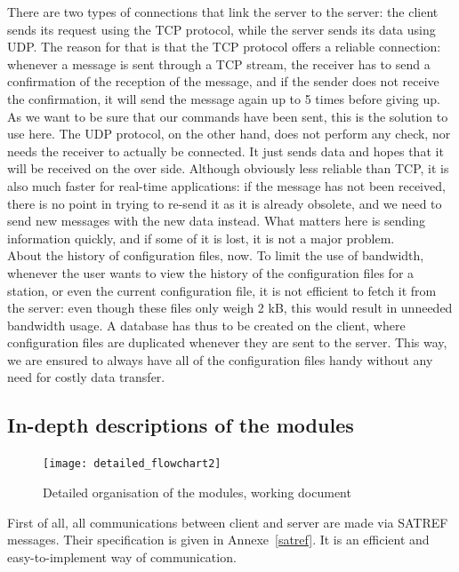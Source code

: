 \documentclass{themeensg}
\begin{document}
There are two types of connections that link the server to the server: the client sends its request using the TCP protocol, while the server sends its data using UDP. The reason for that is that the TCP protocol offers a reliable connection: whenever a message is sent through a TCP stream, the receiver has to send a confirmation of the reception of the message, and if the sender does not receive the confirmation, it will send the message again up to 5 times before giving up. As we want to be sure that our commands have been sent, this is the solution to use here.
The UDP protocol, on the other hand, does not perform any check, nor needs the receiver to actually be connected. It just sends data and hopes that it will be received on the over side. Although obviously less reliable than TCP, it is also much faster for real-time applications: if the message has not been received, there is no point in trying to re-send it as it is already obsolete, and we need to send new messages with the new data instead. What matters here is sending information quickly, and if some of it is lost, it is not a major problem.\\

About the history of configuration files, now. To limit the use of bandwidth, whenever the user wants to view the history of the configuration files for a station, or even the current configuration file, it is not efficient to fetch it from the server: even though these files only weigh 2 kB, this would result in unneeded bandwidth usage.
A database has thus to be created on the client, where configuration files are duplicated whenever they are sent to the server. This way, we are ensured to always have all of the configuration files handy without any need for costly data transfer.


\subsection{In-depth descriptions of the modules}

\begin{figure}[!h]
	\centering
	\texttt{[image: detailed\_flowchart2]}
	\caption{Detailed organisation of the modules, working document}
\end{figure}

First of all, all communications between client and server are made via SATREF messages. Their specification is given in Annexe~\ref{satref}. It is an efficient and easy-to-implement way of communication.
\end{document}
